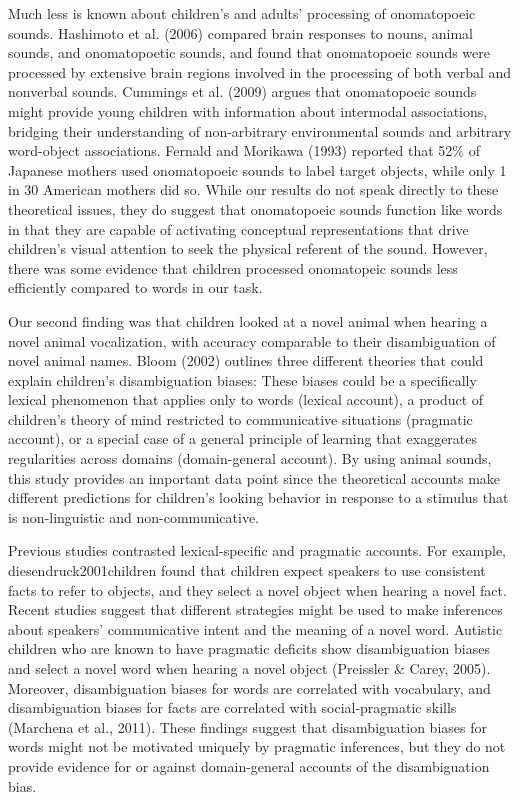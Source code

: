 \documentclass[english,floatsintext,man]{apa6}
\theoremstyle{definition}
\theoremstyle{definition}
\theoremstyle{definition}
\theoremstyle{remark}
\begin{document}
Much less is known about children's and adults' processing of
onomatopoeic sounds. Hashimoto et al. (2006) compared brain responses to
nouns, animal sounds, and onomatopoetic sounds, and found that
onomatopoeic sounds were processed by extensive brain regions involved
in the processing of both verbal and nonverbal sounds. Cummings et al.
(2009) argues that onomatopoeic sounds might provide young children with
information about intermodal associations, bridging their understanding
of non-arbitrary environmental sounds and arbitrary word-object
associations. Fernald and Morikawa (1993) reported that 52\% of Japanese
mothers used onomatopoeic sounds to label target objects, while only 1
in 30 American mothers did so. While our results do not speak directly
to these theoretical issues, they do suggest that onomatopoeic sounds
function like words in that they are capable of activating conceptual
representations that drive children's visual attention to seek the
physical referent of the sound. However, there was some evidence that
children processed onomatopeic sounds less efficiently compared to words
in our task.

Our second finding was that children looked at a novel animal when
hearing a novel animal vocalization, with accuracy comparable to their
disambiguation of novel animal names. Bloom (2002) outlines three
different theories that could explain children's disambiguation biases:
These biases could be a specifically lexical phenomenon that applies
only to words (lexical account), a product of children's theory of mind
restricted to communicative situations (pragmatic account), or a special
case of a general principle of learning that exaggerates regularities
across domains (domain-general account). By using animal sounds, this
study provides an important data point since the theoretical accounts
make different predictions for children's looking behavior in response
to a stimulus that is non-linguistic and non-communicative.

Previous studies contrasted lexical-specific and pragmatic accounts. For
example, diesendruck2001children found that children expect speakers to
use consistent facts to refer to objects, and they select a novel object
when hearing a novel fact. Recent studies suggest that different
strategies might be used to make inferences about speakers'
communicative intent and the meaning of a novel word. Autistic children
who are known to have pragmatic deficits show disambiguation biases and
select a novel word when hearing a novel object (Preissler \& Carey,
2005). Moreover, disambiguation biases for words are correlated with
vocabulary, and disambiguation biases for facts are correlated with
social-pragmatic skills (Marchena et al., 2011). These findings suggest
that disambiguation biases for words might not be motivated uniquely by
pragmatic inferences, but they do not provide evidence for or against
domain-general accounts of the disambiguation bias.
\end{document}
